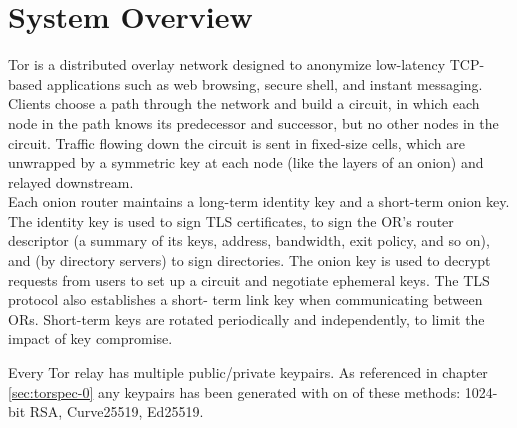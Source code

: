 
\chapter{System Overview}

Tor is a distributed overlay network designed to anonymize low-latency TCP-based applications such as web browsing, secure shell, and instant messaging. Clients choose a path through the network and build a circuit, in which each node in the path knows its predecessor and successor, but no other nodes in the circuit.  Traffic flowing down the circuit is sent in fixed-size cells, which are unwrapped by a symmetric key at each node (like the layers of an onion) and relayed downstream.
\\
Each onion router maintains a long-term identity key and a short-term onion key. The identity key is used to sign TLS certificates, to sign the OR’s router descriptor (a summary of its keys, address, bandwidth, exit policy, and so on), and (by directory servers) to sign directories. The onion key is used to decrypt requests from users to set up a circuit and negotiate ephemeral keys. The TLS protocol also establishes a short- term link key when communicating between ORs. Short-term keys are rotated periodically and independently, to limit the impact of key compromise. \cite{tor_paper}

Every Tor relay has multiple public/private keypairs. As referenced in chapter \ref{sec:torspec-0} any keypairs has been generated with on of these methods: 1024-bit RSA, Curve25519, Ed25519.

